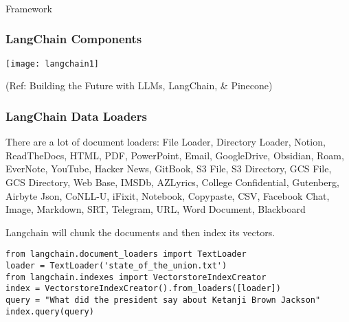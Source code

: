 \begin{frame}[fragile]\frametitle{}
\begin{center}
{\Large Framework}
\end{center}
\end{frame}

\begin{frame}[fragile]\frametitle{LangChain Components}

\begin{center}
\texttt{[image: langchain1]}
\end{center}	  

{\tiny (Ref: Building the Future with LLMs, LangChain, \& Pinecone)}
\end{frame}


\begin{frame}[fragile]\frametitle{LangChain Data Loaders}

There are a lot of document loaders: File Loader, Directory Loader, Notion, ReadTheDocs, HTML, PDF, PowerPoint, Email, GoogleDrive, Obsidian, Roam, EverNote, YouTube, Hacker News, GitBook, S3 File, S3 Directory, GCS File, GCS Directory, Web Base, IMSDb, AZLyrics, College Confidential, Gutenberg, Airbyte Json, CoNLL-U, iFixit, Notebook, Copypaste, CSV, Facebook Chat, Image, Markdown, SRT, Telegram, URL, Word Document, Blackboard

Langchain will chunk the documents and then index its vectors.

\begin{lstlisting}
from langchain.document_loaders import TextLoader
loader = TextLoader('state_of_the_union.txt')
from langchain.indexes import VectorstoreIndexCreator
index = VectorstoreIndexCreator().from_loaders([loader])
query = "What did the president say about Ketanji Brown Jackson"
index.query(query)
\end{lstlisting}	  

\end{frame}


